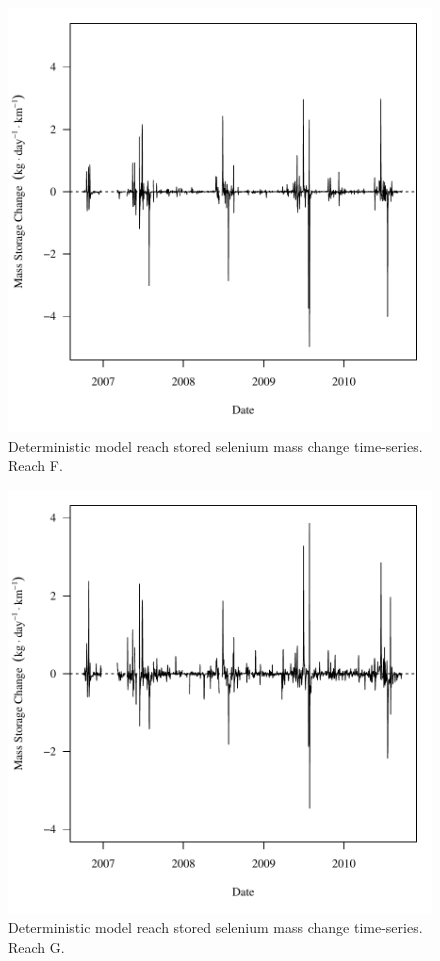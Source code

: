 \begin{figure}[htbp]
	\begin{center}
	\includegraphics[width=6in]{"Figures/Results_DDSR/f Segment F"}
	\caption{Deterministic model reach stored selenium mass change time-series.  Reach F.}
	\end{center}
\end{figure}
\newpage

\begin{figure}[htbp]
	\begin{center}
	\includegraphics[width=6in]{"Figures/Results_DDSR/f Segment G"}
	\caption{Deterministic model reach stored selenium mass change time-series.  Reach G.}
	\end{center}
\end{figure}
\newpage